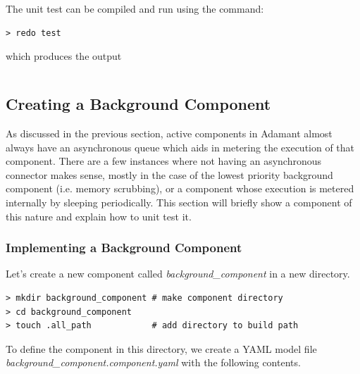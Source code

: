 The unit test can be compiled and run using the command:

\vspace{5mm} %
\begin{verbatim}
> redo test
\end{verbatim}
\vspace{5mm} %

which produces the output

\vspace{5mm} %
\inputminted{text}{../example_architecture/active_component/test/output.txt}
\vspace{5mm} %

\subsection{Creating a Background Component} \label{Creating a Background Component}

As discussed in the previous section, active components in Adamant almost always have an asynchronous queue which aids in metering the execution of that component. There are a few instances where not having an asynchronous connector makes sense, mostly in the case of the lowest priority background component (i.e. memory scrubbing), or a component whose execution is metered internally by sleeping periodically. This section will briefly show a component of this nature and explain how to unit test it.

\subsubsection{Implementing a Background Component} \label{Implementing a Background Component}

Let's create a new component called \textit{background\_component} in a new directory.

\vspace{5mm} %
\begin{verbatim}
> mkdir background_component # make component directory
> cd background_component 
> touch .all_path            # add directory to build path
\end{verbatim}
\vspace{5mm} %

To define the component in this directory, we create a YAML model file \textit{background\_component.component.yaml} with the following contents. \\

